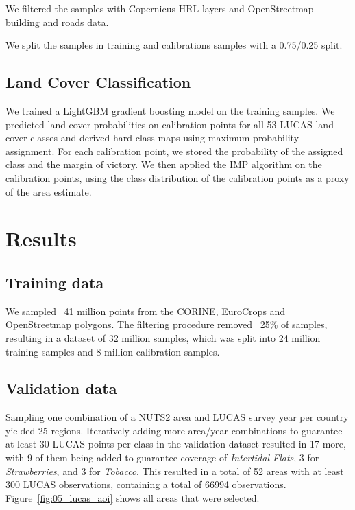 We filtered the samples with Copernicus HRL layers and OpenStreetmap building and roads data. 

We split the samples in training and calibrations samples with a 0.75/0.25 split.



\subsection{Land Cover Classification}
We trained a LightGBM gradient boosting model \citep{ke2017lightgbm} on the training samples.
We predicted land cover probabilities on calibration points for all 53 LUCAS land cover classes and derived hard class maps using maximum probability assignment. For each calibration point, we stored the probability of the assigned class and the margin of victory.
We then applied the IMP algorithm on the calibration points, using the class distribution of the calibration points as a proxy of the area estimate.





\section{Results}
    \subsection{Training data}

        We sampled ~41 million points from the CORINE, EuroCrops and OpenStreetmap polygons. The filtering procedure removed ~25\% of samples, resulting in a dataset of 32 million samples, which was split into 24 million training samples and 8 million calibration samples.
    
\subsection{Validation data}

    Sampling one combination of a NUTS2 area and LUCAS survey year per country yielded 25 regions. Iteratively adding more area/year combinations to guarantee at least 30 LUCAS points per class in the validation dataset resulted in 17 more, with 9 of them being added to guarantee coverage of \textit{Intertidal Flats}, 3 for \textit{Strawberries}, and 3 for \textit{Tobacco}. This resulted in a total of 52 areas with at least 300 LUCAS observations, containing a total of 66994 observations. Figure~\ref{fig:05_lucas_aoi} shows all areas that were selected.
    
